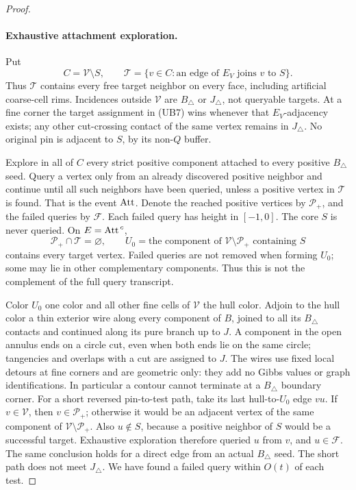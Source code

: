 \begin{proof}
\paragraph{Exhaustive attachment exploration.}
Put
\[
 C=\mathcal V\setminus S,\qquad
 \mathcal T=\{v\in C:\text{an edge of }E_V\text{ joins }v
                                      \text{ to }S\}.             \tag{UB7}
\]
Thus \(\mathcal T\) contains every free target neighbor on every
face, including artificial coarse-cell rims.  Incidences outside
\(\mathcal V\) are \(B_\triangle\) or \(J_\triangle\), not queryable
targets.  At a fine corner the target assignment in (UB7) wins
whenever that \(E_V\)-adjacency exists; any other cut-crossing contact
of the same vertex remains in \(J_\triangle\).
No original pin is adjacent to \(S\), by its non-\(Q\) buffer.

Explore in all of \(C\) every strict positive component attached
to every positive \(B_\triangle\) seed.  Query a vertex only from
an already discovered positive neighbor and continue until all such
neighbors have been queried, unless a positive vertex in \(\mathcal T\)
is found.  That is the event \({\rm Att}\).  Denote the reached
positive vertices by \(\mathcal P_+\), and the failed queries by
\(\mathcal F\).  Each failed query has height in \([-1,0]\).
The core \(S\) is never queried.  On \(E={\rm Att}^{\,c}\),
\[
 \mathcal P_+\cap\mathcal T=\varnothing,\qquad
 U_0=\text{the component of }\mathcal V\setminus\mathcal P_+
                                      \text{ containing }S        \tag{UB8}
\]
contains every target vertex.  Failed queries are not removed when
forming \(U_0\); some may lie in other complementary components.
Thus this is not the complement of the full query transcript.

Color \(U_0\) one color and all other fine cells of \(\mathcal V\)
the hull color.  Adjoin to the hull color a thin exterior wire along
every component of \(B\), joined to all its \(B_\triangle\) contacts
and continued along its pure branch up to \(J\).  A component in the
open annulus ends on a circle cut, even when both ends lie on the same
circle; tangencies and overlaps with a cut are assigned to \(J\).
The wires use fixed local detours at fine corners and are geometric
only: they add no Gibbs values or graph identifications.  In particular
a contour cannot terminate at a \(B_\triangle\) boundary corner.
For a short reversed pin-to-test path, take its last
hull-to-\(U_0\) edge \(vu\).  If \(v\in\mathcal V\), then
\(v\in\mathcal P_+\); otherwise it would be an adjacent vertex of
the same component of \(\mathcal V\setminus\mathcal P_+\).
Also \(u\notin S\), because a positive neighbor of \(S\) would be
a successful target.  Exhaustive exploration therefore queried \(u\)
from \(v\), and \(u\in\mathcal F\).  The same conclusion holds for
a direct edge from an actual \(B_\triangle\) seed.  The short path
does not meet \(J_\triangle\).  We have found a failed query within
\(O(t)\) of each test.


\end{proof}
